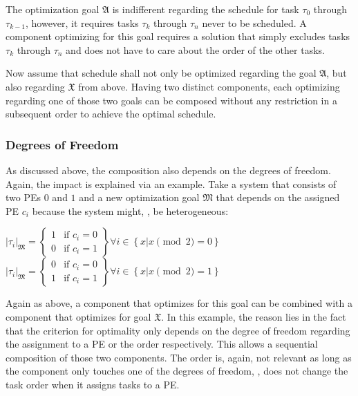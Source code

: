 The optimization goal \(\mathfrak{A}\) is indifferent regarding the schedule for task \(\tau_0\) through \(\tau_{k-1}\), however, it requires tasks \(\tau_k\) through \(\tau_n\) never to be scheduled. A component optimizing for this goal requires a solution that simply excludes tasks \(\tau_k\) through \(\tau_n\) and does not have to care about the order of the other tasks.

Now assume that schedule shall not only be optimized regarding the goal \(\mathfrak{A}\), but also regarding \(\mathfrak{X}\) from above. Having two distinct components, each optimizing regarding one of those two goals can be composed without any restriction in a subsequent order to achieve the optimal schedule.

\subsubsection{Degrees of Freedom}%
\label{sec:prop:compo:ability:freedom}

As discussed above, the composition also depends on the degrees of freedom. Again, the impact is explained via an example. Take a system that consists of two \acp{PE} \(0\) and \(1\) and a new optimization goal \(\mathfrak{M}\) that depends on the assigned \ac{PE} \(c_i\) because the system might, \eg{}, be heterogeneous:

\begin{center}
	\(|\tau_i|_\mathfrak{M} = \left\{ \begin{array}{ll}
		1 & \mbox{if } c_i = 0 \\
		0 & \mbox{if } c_i = 1
	\end{array}\right\} \forall i \in \left\{x | x\pmod 2 = 0 \right\}\)
	\\ \vspace{2mm}
	\(|\tau_i|_\mathfrak{M} = \left\{ \begin{array}{ll}
		0 & \mbox{if } c_i = 0 \\
		1 & \mbox{if } c_i = 1
	\end{array}\right\} \forall i \in \left\{x | x\pmod 2 = 1 \right\}\)
\end{center}

Again as above, a component that optimizes for this goal can be combined with a component that optimizes for goal \(\mathfrak{X}\). In this example, the reason lies in the fact that the criterion for optimality only depends on the degree of freedom regarding the assignment to a \ac{PE} or the order respectively. This allows a sequential composition of those two components. The order is, again, not relevant as long as the component only touches one of the degrees of freedom, \ie{}, does not change the task order when it assigns tasks to a \ac{PE}.

